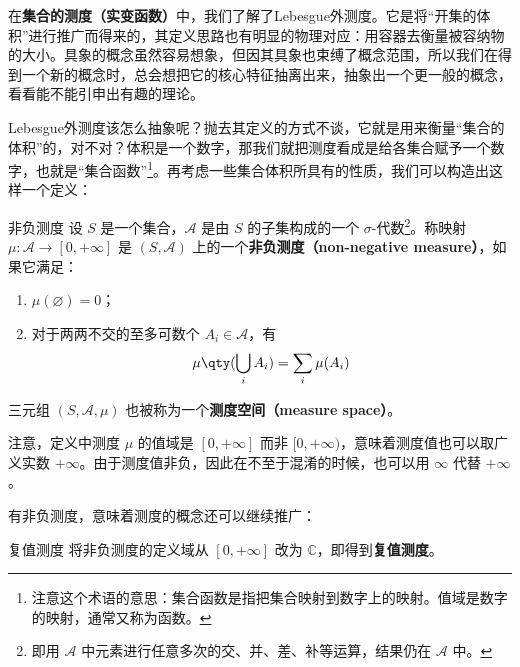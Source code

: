 

在\textbf{集合的测度（实变函数）}中，我们了解了Lebesgue外测度。它是将“开集的体积”进行推广而得来的，其定义思路也有明显的物理对应：用容器去衡量被容纳物的大小。具象的概念虽然容易想象，但因其具象也束缚了概念范围，所以我们在得到一个新的概念时，总会想把它的核心特征抽离出来，抽象出一个更一般的概念，看看能不能引申出有趣的理论。

Lebesgue外测度该怎么抽象呢？抛去其定义的方式不谈，它就是用来衡量“集合的体积”的，对不对？体积是一个数字，那我们就把测度看成是给各集合赋予一个数字，也就是“集合函数”\footnote{注意这个术语的意思：集合函数是指把集合映射到数字上的映射。值域是数字的映射，通常又称为函数。}。再考虑一些集合体积所具有的性质，我们可以构造出这样一个定义：

\begin{definition}{非负测度}\label{GenFun_def1}
设 $S$ 是一个集合，$\mathcal{A}$ 是由 $S$ 的子集构成的一个 $\sigma$-代数\footnote{即用 $\mathcal{A}$ 中元素进行任意多次的交、并、差、补等运算，结果仍在 $\mathcal{A}$ 中。}。称映射 $\mu:\mathcal{A}\to [0, +\infty]$ 是 $(S, \mathcal{A})$ 上的一个\textbf{非负测度（non-negative measure）}，如果它满足：
\begin{enumerate}
\item $\mu(\varnothing)=0$；\\
\item 对于两两不交的至多可数个 $A_i\in\mathcal{A}$，有
\begin{equation}
\mu\qty(\bigcup_i A_i) = \sum_i \mu(A_i)
\end{equation}
\end{enumerate}


三元组 $(S, \mathcal{A}, \mu)$ 也被称为一个\textbf{测度空间（measure space）}。

\end{definition}

注意，定义中测度 $\mu$ 的值域是 $[0, +\infty]$ 而非 $[0, +\infty)$，意味着测度值也可以取广义实数 $+\infty$。由于测度值非负，因此在不至于混淆的时候，也可以用 $\infty$ 代替 $+\infty$。

有非负测度，意味着测度的概念还可以继续推广：

\begin{definition}{复值测度}
将非负测度的定义域从 $[0, +\infty]$ 改为 $\mathbb{C}$，即得到\textbf{复值测度}。
\end{definition}

